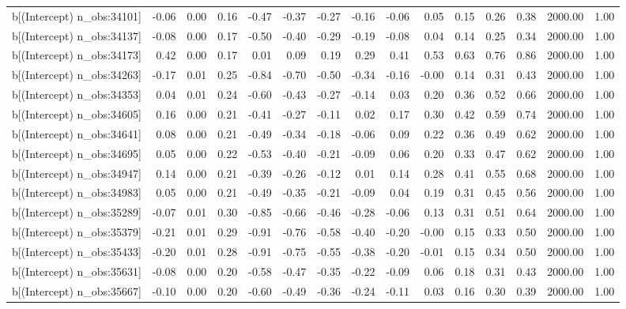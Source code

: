 \begin{table}[ht]
\begin{tabular}{rrrrrrrrrrrrrrr}
  b[(Intercept) n\_obs:34101] & -0.06 & 0.00 & 0.16 & -0.47 & -0.37 & -0.27 & -0.16 & -0.06 & 0.05 & 0.15 & 0.26 & 0.38 & 2000.00 & 1.00 \\ 
  b[(Intercept) n\_obs:34137] & -0.08 & 0.00 & 0.17 & -0.50 & -0.40 & -0.29 & -0.19 & -0.08 & 0.04 & 0.14 & 0.25 & 0.34 & 2000.00 & 1.00 \\ 
  b[(Intercept) n\_obs:34173] & 0.42 & 0.00 & 0.17 & 0.01 & 0.09 & 0.19 & 0.29 & 0.41 & 0.53 & 0.63 & 0.76 & 0.86 & 2000.00 & 1.00 \\ 
  b[(Intercept) n\_obs:34263] & -0.17 & 0.01 & 0.25 & -0.84 & -0.70 & -0.50 & -0.34 & -0.16 & -0.00 & 0.14 & 0.31 & 0.43 & 2000.00 & 1.00 \\ 
  b[(Intercept) n\_obs:34353] & 0.04 & 0.01 & 0.24 & -0.60 & -0.43 & -0.27 & -0.14 & 0.03 & 0.20 & 0.36 & 0.52 & 0.66 & 2000.00 & 1.00 \\ 
  b[(Intercept) n\_obs:34605] & 0.16 & 0.00 & 0.21 & -0.41 & -0.27 & -0.11 & 0.02 & 0.17 & 0.30 & 0.42 & 0.59 & 0.74 & 2000.00 & 1.00 \\ 
  b[(Intercept) n\_obs:34641] & 0.08 & 0.00 & 0.21 & -0.49 & -0.34 & -0.18 & -0.06 & 0.09 & 0.22 & 0.36 & 0.49 & 0.62 & 2000.00 & 1.00 \\ 
  b[(Intercept) n\_obs:34695] & 0.05 & 0.00 & 0.22 & -0.53 & -0.40 & -0.21 & -0.09 & 0.06 & 0.20 & 0.33 & 0.47 & 0.62 & 2000.00 & 1.00 \\ 
  b[(Intercept) n\_obs:34947] & 0.14 & 0.00 & 0.21 & -0.39 & -0.26 & -0.12 & 0.01 & 0.14 & 0.28 & 0.41 & 0.55 & 0.68 & 2000.00 & 1.00 \\ 
  b[(Intercept) n\_obs:34983] & 0.05 & 0.00 & 0.21 & -0.49 & -0.35 & -0.21 & -0.09 & 0.04 & 0.19 & 0.31 & 0.45 & 0.56 & 2000.00 & 1.00 \\ 
  b[(Intercept) n\_obs:35289] & -0.07 & 0.01 & 0.30 & -0.85 & -0.66 & -0.46 & -0.28 & -0.06 & 0.13 & 0.31 & 0.51 & 0.64 & 2000.00 & 1.00 \\ 
  b[(Intercept) n\_obs:35379] & -0.21 & 0.01 & 0.29 & -0.91 & -0.76 & -0.58 & -0.40 & -0.20 & -0.00 & 0.15 & 0.33 & 0.50 & 2000.00 & 1.00 \\ 
  b[(Intercept) n\_obs:35433] & -0.20 & 0.01 & 0.28 & -0.91 & -0.75 & -0.55 & -0.38 & -0.20 & -0.01 & 0.15 & 0.34 & 0.50 & 2000.00 & 1.00 \\ 
  b[(Intercept) n\_obs:35631] & -0.08 & 0.00 & 0.20 & -0.58 & -0.47 & -0.35 & -0.22 & -0.09 & 0.06 & 0.18 & 0.31 & 0.43 & 2000.00 & 1.00 \\ 
  b[(Intercept) n\_obs:35667] & -0.10 & 0.00 & 0.20 & -0.60 & -0.49 & -0.36 & -0.24 & -0.11 & 0.03 & 0.16 & 0.30 & 0.39 & 2000.00 & 1.00 \\ 

\end{tabular}
\end{table}
